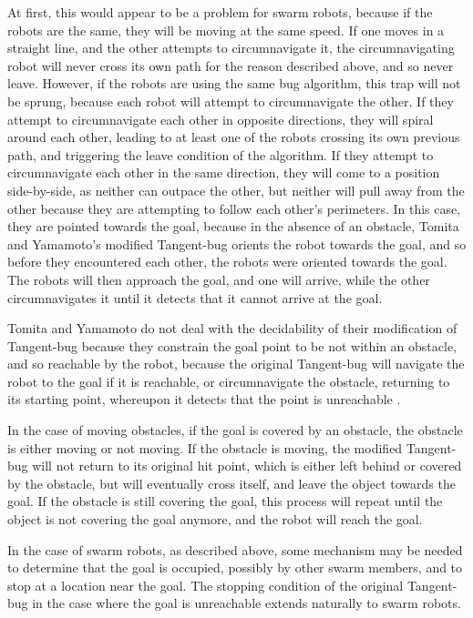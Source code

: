 At first, this would appear to be a problem for swarm robots, because if the robots are the same, they will be moving at the same speed. 
If one moves in a straight line, and the other attempts to circumnavigate it, the circumnavigating robot will never cross its own path for the reason described above, and so never leave. 
However, if the robots are using the same bug algorithm, this trap will not be sprung, because each robot will attempt to circumnavigate the other. 
If they attempt to circumnavigate each other in opposite directions, they will spiral around each other, leading to at least one of the robots crossing its own previous path, and triggering the leave condition of the algorithm. 
If they attempt to circumnavigate each other in the same direction, they will come to a position side-by-side, as neither can outpace the other, but neither will pull away from the other because they are attempting to follow each other's perimeters. 
In this case, they are pointed towards the goal, because in the absence of an obstacle, Tomita and Yamamoto's modified Tangent-bug orients the robot towards the goal, and so before they encountered each other, the robots were oriented towards the goal.
The robots will then approach the goal, and one will arrive, while the other circumnavigates it until it detects that it cannot arrive at the goal. 

Tomita and Yamamoto do not deal with the decidability of their modification of Tangent-bug because they constrain the goal point to be not within an obstacle, and so reachable by the robot, because the original Tangent-bug will navigate the robot to the goal if it is reachable, or circumnavigate the obstacle, returning to its starting point, whereupon it detects that the point is unreachable \citep{kamon1998tangentbug}.

In the case of moving obstacles, if the goal is covered by an obstacle, the obstacle is either moving or not moving. If the obstacle is moving, the modified Tangent-bug will not return to its original hit point, which is either left behind or covered by the obstacle, but will eventually cross itself, and leave the object towards the goal.
If the obstacle is still covering the goal, this process will repeat until the object is not covering the goal anymore, and the robot will reach the goal. 

In the case of swarm robots, as described above, some mechanism may be needed to determine that the goal is occupied, possibly by other swarm members, and to stop at a location near the goal. 
The stopping condition of the original Tangent-bug in the case where the goal is unreachable extends naturally to swarm robots. 

